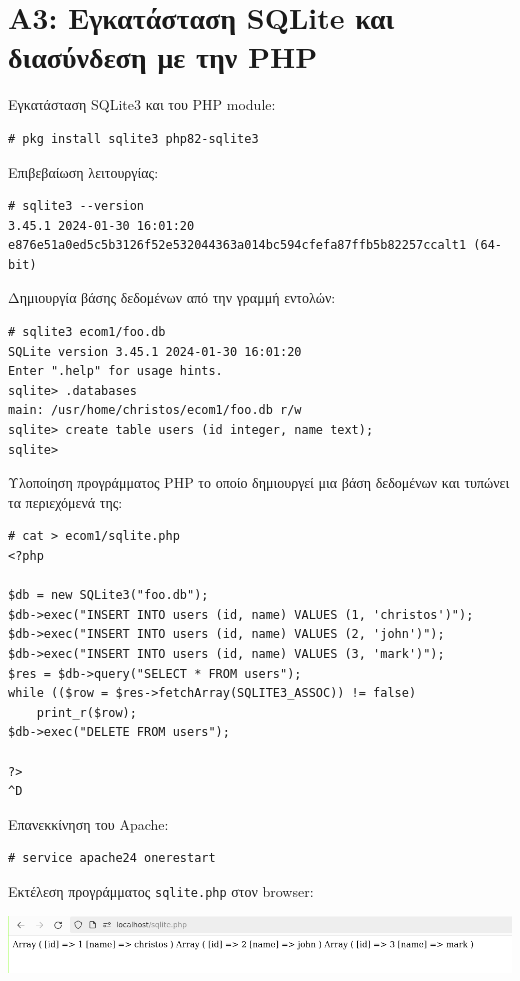 \documentclass[12pt]{article}
\begin{document}
\section{Α3: Εγκατάσταση SQLite και διασύνδεση με την PHP}

Εγκατάσταση SQLite3 και του PHP module:

\begin{lstlisting}
# pkg install sqlite3 php82-sqlite3
\end{lstlisting}

Επιβεβαίωση λειτουργίας:

\begin{lstlisting}
# sqlite3 --version
3.45.1 2024-01-30 16:01:20 e876e51a0ed5c5b3126f52e532044363a014bc594cfefa87ffb5b82257ccalt1 (64-bit)
\end{lstlisting}

Δημιουργία βάσης δεδομένων από την γραμμή εντολών:

\begin{lstlisting}
# sqlite3 ecom1/foo.db
SQLite version 3.45.1 2024-01-30 16:01:20
Enter ".help" for usage hints.
sqlite> .databases
main: /usr/home/christos/ecom1/foo.db r/w
sqlite> create table users (id integer, name text);
sqlite>
\end{lstlisting}

Υλοποίηση προγράμματος PHP το οποίο δημιουργεί μια βάση δεδομένων και τυπώνει
τα περιεχόμενά της:

\begin{lstlisting}
# cat > ecom1/sqlite.php
<?php

$db = new SQLite3("foo.db");
$db->exec("INSERT INTO users (id, name) VALUES (1, 'christos')");
$db->exec("INSERT INTO users (id, name) VALUES (2, 'john')");
$db->exec("INSERT INTO users (id, name) VALUES (3, 'mark')");
$res = $db->query("SELECT * FROM users");
while (($row = $res->fetchArray(SQLITE3_ASSOC)) != false)
	print_r($row);
$db->exec("DELETE FROM users");

?>
^D
\end{lstlisting}

Επανεκκίνηση του Apache:

\begin{lstlisting}
# service apache24 onerestart
\end{lstlisting}

Εκτέλεση προγράμματος \lstinline{sqlite.php} στον browser:

\includegraphics[width=\textwidth]{res/sqlite.png} \\
\end{document}
